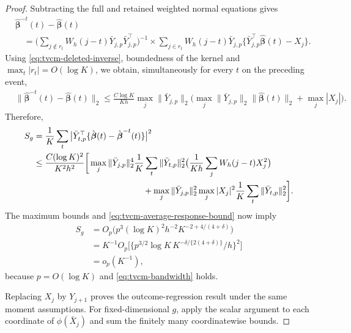 \documentclass[12pt]{article}
\numberwithin{equation}{section}
\begin{document}
\begin{proof}
Subtracting the full and retained weighted normal equations
gives
\begin{align*}
&\hat{\boldsymbol\beta}^{-t}(t)
-\hat{\boldsymbol\beta}(t)\\
&\quad=
\big(
\sum_{j\notin r_t}W_h(j-t)
\bar Y_{j,p}\bar Y_{j,p}^\top
\big)^{-1}\times
\sum_{j\in r_t}W_h(j-t)\bar Y_{j,p}
\{\bar Y_{j,p}^\top\hat{\boldsymbol\beta}(t)-X_j\}.
\end{align*}
Using \eqref{eq:tvcm-deleted-inverse}, boundedness of the
kernel and $\max_t|r_t|=O(\log K)$, we obtain, simultaneously
for every $t$ on the preceding event,
\begin{align*}
&\|\hat{\boldsymbol\beta}^{-t}(t)
-\hat{\boldsymbol\beta}(t)\|_2\leq
\frac{C\log K}{Kh}
\max_j\|\bar Y_{j,p}\|_2
\big(
\max_j\|\bar Y_{j,p}\|_2
\|\hat{\boldsymbol\beta}(t)\|_2
+\max_j|X_j|
\big).
\end{align*}
Therefore,
\begin{align*}
S_g
&=
\frac1K\sum_t
\big|
\bar Y_{t,p}^\top
\{\hat{\boldsymbol\beta}(t)
-\hat{\boldsymbol\beta}^{-t}(t)\}
\big|^2\\
&\leq
\frac{C(\log K)^2}{K^2h^2}
\bigg[
\max_j\|\bar Y_{j,p}\|_2^4
\frac1K\sum_t\|\bar Y_{t,p}\|_2^2
\big(
\frac1{Kh}\sum_jW_h(j-t)X_j^2
\big)\\
&\hspace{45mm}{}
+\max_j\|\bar Y_{j,p}\|_2^2
\max_j|X_j|^2
\frac1K\sum_t\|\bar Y_{t,p}\|_2^2
\bigg].
\end{align*}
The maximum bounds and
\eqref{eq:tvcm-average-response-bound} now imply
\begin{align*}
S_g
&=
O_p\big(
p^3(\log K)^2h^{-2}
K^{-2+4/(4+\delta)}
\big)\\
&=
K^{-1}O_p\bigg[
\big\{
p^{3/2}\log K\,
K^{-\delta/\{2(4+\delta)\}}/h
\big\}^2
\bigg]\\
&=o_p(K^{-1}),
\end{align*}
because $p=O(\log K)$ and
\eqref{eq:tvcm-bandwidth} holds.

Replacing $X_j$ by $Y_{j+1}$ proves the outcome-regression
result under the same moment assumptions.
For fixed-dimensional $g$, apply the scalar argument to each
coordinate of $\phi(\bar X_j)$ and sum the finitely many
coordinatewise bounds.
\end{proof}
\end{document}
